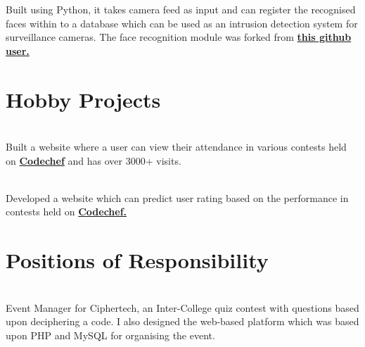 \documentclass[]{deedy-resume-openfont}
\begin{document}
\begin{minipage}[t]{0.66\textwidth}
\sectionsep

\href{https://github.com/Shraeyas/IP-Camera-Intrusion-Detection}{}
Built using Python, it takes camera feed as input and can register the recognised faces within to a database which can be used as an intrusion detection system for surveillance cameras. The face recognition module was forked from \textbf{\href{https://github.com/ageitgey/face_recognition}{this github user.}}
\sectionsep


\section{Hobby Projects}
\href{https://cat.databread.xyz/}{}\\
Built a website where a user can view their attendance in various contests held on \textbf{\href{https://codechef.com}{Codechef}} and has over 3000+ visits.

\sectionsep

\href{https://crp.databread.xyz/}{}\\
Developed a website which can predict user rating based on the performance in contests held on \textbf{\href{https://codechef.com}{Codechef.}}
\sectionsep


\section{Positions of Responsibility}

\\
Event Manager for Ciphertech, an Inter-College quiz contest with questions based upon deciphering a code. I also designed the web-based platform which was based upon PHP and MySQL for organising the event.

\end{minipage} 
\end{document}
